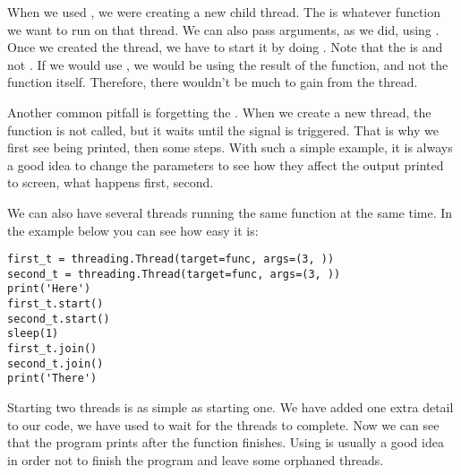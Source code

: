 When we used , we were creating a new child thread. The  is whatever function we want to run on that thread. We can also pass arguments, as we did, using . Once we created the thread, we have to start it by doing . Note that the  is  and not . If we would use , we would be using the result of the function, and not the function itself. Therefore, there wouldn't be much to gain from the thread.


Another common pitfall is forgetting the . When we create a new thread, the function is not called, but it waits until the  signal is triggered. That is why we first see  being printed, then some steps. With such a simple example, it is always a good idea to change the parameters to see how they affect the output printed to screen, what happens first, second.

We can also have several threads running the same function at the same time. In the example below you can see how easy it is:

\begin{verbatim}
first_t = threading.Thread(target=func, args=(3, ))
second_t = threading.Thread(target=func, args=(3, ))
print('Here')
first_t.start()
second_t.start()
sleep(1)
first_t.join()
second_t.join()
print('There')
\end{verbatim}

Starting two threads is as simple as starting one. We have added one extra detail to our code, we have used  to wait for the threads to complete. Now we can see that the program prints  after the function finishes. Using  is usually a good idea in order not to finish the program and leave some orphaned threads.


